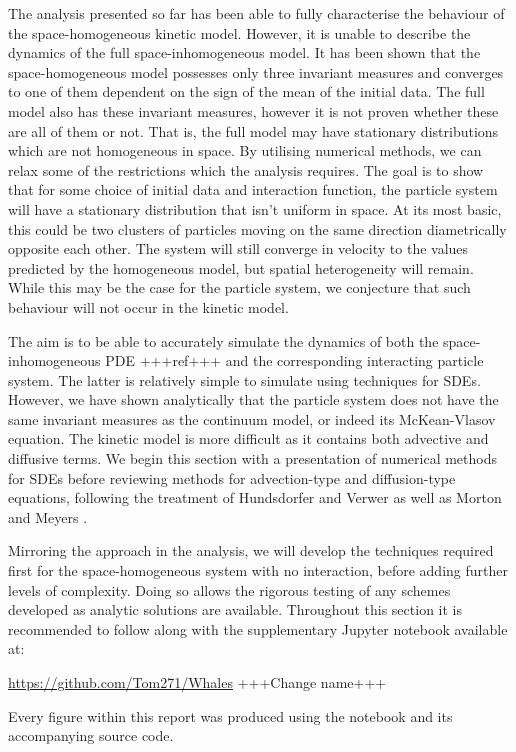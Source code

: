     The analysis presented so far has been able to fully characterise the behaviour of the space-homogeneous kinetic model. However, it is unable to describe the dynamics of the full space-inhomogeneous model. It has been shown that the space-homogeneous model possesses only three invariant measures and converges to one of them dependent on the sign of the mean of the initial data. The full model also has these invariant measures, however it is not proven whether these are all of them or not. That is, the full model may have stationary distributions which are not homogeneous in space. By utilising numerical methods, we can relax some of the restrictions which the analysis requires. The goal is to show that for some choice of initial data and interaction function, the particle system will have a stationary distribution that isn't uniform in space. At its most basic, this could be two clusters of particles moving on the same direction diametrically opposite each other. The system will still converge in velocity to the values predicted by the homogeneous model, but spatial heterogeneity will remain. While this may be the case for the particle system, we conjecture that such behaviour will not occur in the kinetic model.
    
    The aim is to be able to accurately simulate the dynamics of both the space-inhomogeneous PDE +++ref+++ and the corresponding interacting particle system. The latter is relatively simple to simulate using techniques for SDEs. However, we have shown analytically that the particle system does not have the same invariant measures as the continuum model, or indeed its McKean-Vlasov equation. The kinetic model is more difficult as it contains both advective and diffusive terms. We begin this section with a presentation of numerical methods for SDEs before reviewing methods for advection-type and diffusion-type equations, following the treatment of Hundsdorfer and Verwer \cite{Hundsdorfer2007} as well as Morton and Meyers \cite{Morton2005}.
    
    Mirroring the approach in the analysis, we will develop the techniques required first for the space-homogeneous system with no interaction, before adding further levels of complexity. Doing so allows the rigorous testing of any schemes developed as analytic solutions are available. Throughout this section it is recommended to follow along with the supplementary Jupyter notebook available at: 
    \begin{center} \url{https://github.com/Tom271/Whales} +++Change name+++ \end{center}
    Every figure within this report was produced using the notebook and its accompanying source code.
    
